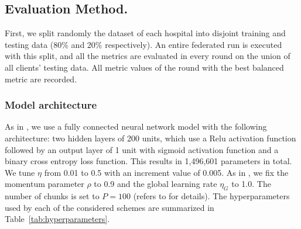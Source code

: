 \documentclass[accepted]{uai2021} %
\newcommand{\Tgd}{T_{\mathsf{gd}}}
\begin{document}
\subsection{Evaluation Method.}
First, we split randomly the dataset of each hospital into disjoint training and testing data (80\% and 20\% respectively).
An entire federated run is executed with this split, and all the metrics are evaluated in every round on the union of all clients' testing data. 
All metric values of the round with the best balanced metric are recorded.




\subsubsection{Model architecture}

As in \cite{Avati2018,our_cs}, we use a fully connected neural network model with the following architecture: two hidden layers of 200 units, which use a Relu activation function followed by an output layer of 1 unit with sigmoid activation function and a binary cross entropy loss function. This results in 1,496,601 parameters in total. We tune $\eta$ from 0.01 to 0.5 with an increment value of 0.005. As in \cite{our_cs}, we fix the momentum parameter $\rho$ to 0.9 and the global learning rate $\eta_{G}$ to 1.0. The number of chunks is set to $P =100$ (refers to \cite{our_cs} for details). The hyperparameters used by each of the considered schemes are summarized in Table~\ref{tab:hyperparameters}.



\end{document}
